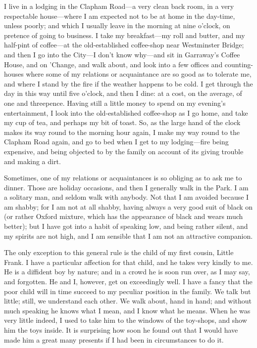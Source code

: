I live in a lodging in the Clapham Road---a very clean back room, in
a very respectable house---where I am expected not to be at home in
the day-time, unless poorly; and which I usually leave in the
morning at nine o'clock, on pretence of going to business.  I take
my breakfast---my roll and butter, and my half-pint of coffee---at the
old-established coffee-shop near Westminster Bridge; and then I go
into the City---I don't know why---and sit in Garraway's Coffee House,
and on 'Change, and walk about, and look into a few offices and
counting-houses where some of my relations or acquaintance are so
good as to tolerate me, and where I stand by the fire if the weather
happens to be cold.  I get through the day in this way until five
o'clock, and then I dine:  at a cost, on the average, of one and
threepence.  Having still a little money to spend on my evening's
entertainment, I look into the old-established coffee-shop as I go
home, and take my cup of tea, and perhaps my bit of toast.  So, as
the large hand of the clock makes its way round to the morning hour
again, I make my way round to the Clapham Road again, and go to bed
when I get to my lodging---fire being expensive, and being objected
to by the family on account of its giving trouble and making a dirt.

Sometimes, one of my relations or acquaintances is so obliging as to
ask me to dinner.  Those are holiday occasions, and then I generally
walk in the Park.  I am a solitary man, and seldom walk with
anybody.  Not that I am avoided because I am shabby; for I am not at
all shabby, having always a very good suit of black on (or rather
Oxford mixture, which has the appearance of black and wears much
better); but I have got into a habit of speaking low, and being
rather silent, and my spirits are not high, and I am sensible that I
am not an attractive companion.

The only exception to this general rule is the child of my first
cousin, Little Frank.  I have a particular affection for that child,
and he takes very kindly to me.  He is a diffident boy by nature;
and in a crowd he is soon run over, as I may say, and forgotten.  He
and I, however, get on exceedingly well.  I have a fancy that the
poor child will in time succeed to my peculiar position in the
family.  We talk but little; still, we understand each other.  We
walk about, hand in hand; and without much speaking he knows what I
mean, and I know what he means.  When he was very little indeed, I
used to take him to the windows of the toy-shops, and show him the
toys inside.  It is surprising how soon he found out that I would
have made him a great many presents if I had been in circumstances
to do it.

